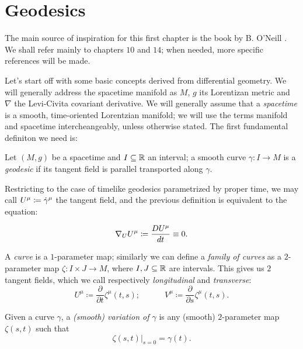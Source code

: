 \section{Geodesics}\label{sec:geodesics}

The main source of inspiration for this first chapter is the book by B. O'Neill \cite{o1983semi}. We shall refer mainly to chapters \(10\) and \(14\); when needed, more specific references will be made.

Let's start off with some basic concepts derived from differential geometry. We will generally address the spacetime manifold as \(M\), \(g\) its Lorentizan metric and \(\nabla\) the Levi-Civita covariant derivative.
We will generally assume that a \emph{spacetime} is a smooth, time-oriented Lorentzian manifold; we will use the terms manifold and spacetime intercheangeably, unless otherwise stated.
The first fundamental definiton we need is:
\begin{definition}
	Let \((M, g)\) be a spacetime and \(I \subseteq {\mathbb{R}}\) an interval; a smooth curve \(\gamma : I \rightarrow M\) is a \emph{geodesic} if its tangent field is parallel transported along \(\gamma\).\\
\end{definition}    


Restricting to the case of timelike geodesics parametrized by proper time, we may call \(U\indices{^{\mu}} \coloneqq \dot{\gamma}^{\mu}\) the tangent field, and the previous definition is equivalent to the equation:

\begin{equation}
\label{eq:tang-trans-fields}
\nabla_U U^{\mu} \coloneqq \frac{D\tensor{U}{^\mu} }{dt} \equiv 0.
\end{equation}



A \emph{curve} is a \(1\)-parameter map; similarly we can define a \emph{family of curves} as a \(2\)-parameter map \(\zeta: I \times J \rightarrow M\), where \(I, J \subseteq {\mathbb{R}}\) are intervals. This gives us \(2\) tangent fields, which we call respectively \emph{longitudinal} and \emph{transverse}:
\[
U^{\mu} \coloneqq \frac{\partial}{\partial t} \zeta^{\mu}(t,s); \quad \quad \quad 
V^{\mu} \coloneqq \frac{\partial}{\partial s} \zeta^{\mu}(t,s). 
\]

\begin{definition}
	Given a curve \(\gamma\), a \emph{(smooth) variation of \(\gamma\)} is any (smooth) \(2\)-parameter map \(\zeta(s,t)\) such that 
	\[
	\left. \zeta(s, t) \right\vert_{s = 0} = \gamma(t).
	\]
\end{definition}

